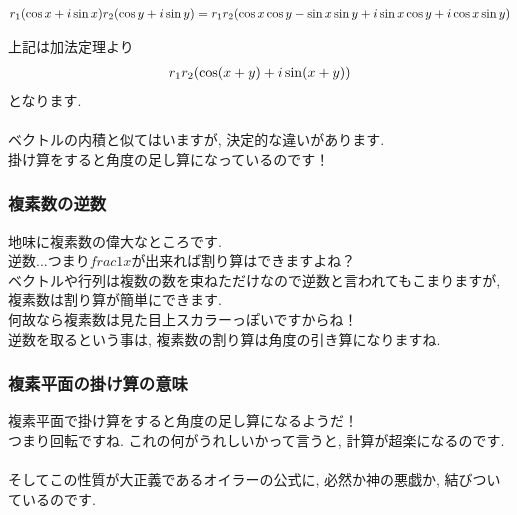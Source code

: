 \documentclass[11pt,a4paper]{jsarticle}
\begin{document}
\begin{eqnarray}
\mathstrut r_1(\cos x + \mathstrut i\sin x)\mathstrut r_2(\cos y + \mathstrut i\sin y) = \mathstrut r_1\mathstrut r_2(\cos x\cos y - \sin x\sin y + \mathstrut i\sin x \cos y + \mathstrut i\cos x\sin y)
\end{eqnarray}

上記は加法定理より
\begin{eqnarray}
\mathstrut r_1\mathstrut r_2(\cos (\mathstrut x + \mathstrut y) + \mathstrut i\sin (\mathstrut x + \mathstrut y))
\end{eqnarray}
となります.\\
\\
ベクトルの内積と似てはいますが, 決定的な違いがあります.\\
掛け算をすると角度の足し算になっているのです！\\

\subsubsection{複素数の逆数}
地味に複素数の偉大なところです.\\
逆数...つまり$frac{1}{x}$が出来れば割り算はできますよね？\\
ベクトルや行列は複数の数を束ねただけなので逆数と言われてもこまりますが, 複素数は割り算が簡単にできます. \\
何故なら複素数は見た目上スカラーっぽいですからね！\\
逆数を取るという事は, 複素数の割り算は角度の引き算になりますね.\\

\subsubsection{複素平面の掛け算の意味}
複素平面で掛け算をすると角度の足し算になるようだ！\\
つまり回転ですね. これの何がうれしいかって言うと, 計算が超楽になるのです.\\
\\

そしてこの性質が大正義であるオイラーの公式に, 必然か神の悪戯か, 結びついているのです.
\end{document}
